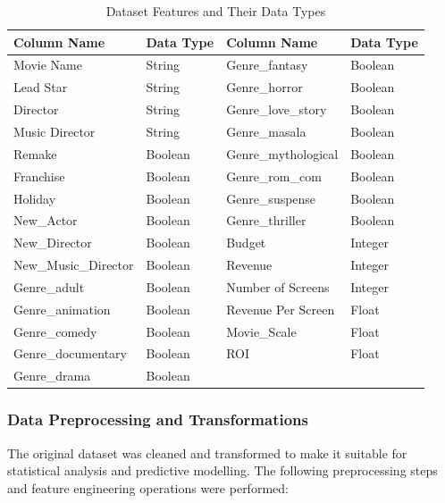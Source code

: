 \documentclass[a4paper, 11pt]{article}
\begin{document}
\begin{table}[htbp]
\centering
\caption{Dataset Features and Their Data Types}
\label{tab:dataset_features}
\renewcommand{\arraystretch}{1.1} %
\begin{tabular}{|l|l||l|l|}
\hline
\textbf{Column Name} & \textbf{Data Type} & \textbf{Column Name} & \textbf{Data Type} \\ \hline
Movie Name & String & Genre\_fantasy & Boolean \\ \hline
Lead Star & String & Genre\_horror & Boolean \\ \hline
Director & String & Genre\_love\_story & Boolean \\ \hline
Music Director & String & Genre\_masala & Boolean \\ \hline
Remake & Boolean & Genre\_mythological & Boolean \\ \hline
Franchise & Boolean & Genre\_rom\_com & Boolean \\ \hline
Holiday & Boolean & Genre\_suspense & Boolean \\ \hline
New\_Actor & Boolean & Genre\_thriller & Boolean \\ \hline
New\_Director & Boolean & Budget & Integer \\ \hline
New\_Music\_Director & Boolean & Revenue & Integer \\ \hline
Genre\_adult & Boolean & Number of Screens & Integer \\ \hline
Genre\_animation & Boolean & Revenue Per Screen & Float \\ \hline
Genre\_comedy & Boolean & Movie\_Scale & Float \\ \hline
Genre\_documentary & Boolean & ROI & Float \\ \hline
Genre\_drama & Boolean & & \\ \hline
\end{tabular}
\end{table}

\subsubsection*{Data Preprocessing and Transformations}

The original dataset was cleaned and transformed to make it suitable for statistical analysis and predictive modelling. The following preprocessing steps and feature engineering operations were performed:
\end{document}
